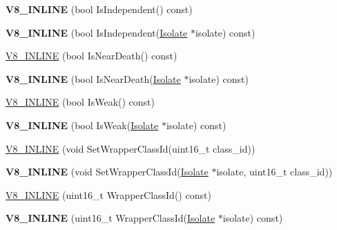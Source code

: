 \begin{DoxyCompactItemize}
\item 
\hypertarget{classv8_1_1_persistent_ae63945077238e19dbe1566c316c1c774}{}{\bfseries V8\+\_\+\+I\+N\+L\+I\+N\+E} (bool Is\+Independent() const)\label{classv8_1_1_persistent_ae63945077238e19dbe1566c316c1c774}

\item 
\hypertarget{classv8_1_1_persistent_a0cb1529e8138c0072f6efac79056e225}{}{\bfseries V8\+\_\+\+I\+N\+L\+I\+N\+E} (bool Is\+Independent(\hyperlink{classv8_1_1_isolate}{Isolate} $\ast$isolate) const)\label{classv8_1_1_persistent_a0cb1529e8138c0072f6efac79056e225}

\item 
\hyperlink{classv8_1_1_persistent_a480643005f3ce865ea6084a9249dbf6f}{V8\+\_\+\+I\+N\+L\+I\+N\+E} (bool Is\+Near\+Death() const)
\item 
\hypertarget{classv8_1_1_persistent_af76521b3119940e7200fd12ea6aac533}{}{\bfseries V8\+\_\+\+I\+N\+L\+I\+N\+E} (bool Is\+Near\+Death(\hyperlink{classv8_1_1_isolate}{Isolate} $\ast$isolate) const)\label{classv8_1_1_persistent_af76521b3119940e7200fd12ea6aac533}

\item 
\hyperlink{classv8_1_1_persistent_ab3ecacdf4c67a295d57658e348153b6c}{V8\+\_\+\+I\+N\+L\+I\+N\+E} (bool Is\+Weak() const)
\item 
\hypertarget{classv8_1_1_persistent_acfa08355e94e227b6319123d40cd8710}{}{\bfseries V8\+\_\+\+I\+N\+L\+I\+N\+E} (bool Is\+Weak(\hyperlink{classv8_1_1_isolate}{Isolate} $\ast$isolate) const)\label{classv8_1_1_persistent_acfa08355e94e227b6319123d40cd8710}

\item 
\hyperlink{classv8_1_1_persistent_a57a08d23ba324fee6b86e4df808e1d6d}{V8\+\_\+\+I\+N\+L\+I\+N\+E} (void Set\+Wrapper\+Class\+Id(uint16\+\_\+t class\+\_\+id))
\item 
\hypertarget{classv8_1_1_persistent_a929e7d86fc54c414931805e01e3af9e4}{}{\bfseries V8\+\_\+\+I\+N\+L\+I\+N\+E} (void Set\+Wrapper\+Class\+Id(\hyperlink{classv8_1_1_isolate}{Isolate} $\ast$isolate, uint16\+\_\+t class\+\_\+id))\label{classv8_1_1_persistent_a929e7d86fc54c414931805e01e3af9e4}

\item 
\hyperlink{classv8_1_1_persistent_aea12008dfeca52acd8e687187c25e4b7}{V8\+\_\+\+I\+N\+L\+I\+N\+E} (uint16\+\_\+t Wrapper\+Class\+Id() const)
\item 
\hypertarget{classv8_1_1_persistent_a212b9d40b2152e00fe9e7e028c296fea}{}{\bfseries V8\+\_\+\+I\+N\+L\+I\+N\+E} (uint16\+\_\+t Wrapper\+Class\+Id(\hyperlink{classv8_1_1_isolate}{Isolate} $\ast$isolate) const)\label{classv8_1_1_persistent_a212b9d40b2152e00fe9e7e028c296fea}


\end{DoxyCompactItemize}
